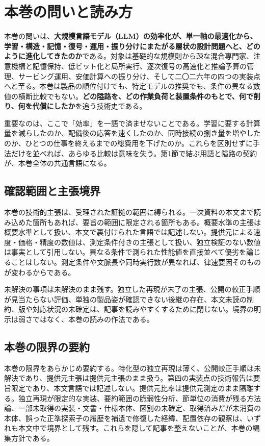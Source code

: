 \documentclass[lualatex,a4paper,10pt]{jlreq}
\begin{document}
\surveycover
\clearpage

\section*{本巻の問いと読み方}
本巻の問いは、\textbf{大規模言語モデル（LLM）の効率化が、単一軸の最適化から、学習・構造・記憶・復号・運用・振り分けにまたがる層状の設計問題へと、どのように進化してきたのか}である。対象は基礎的な規模則から疎な混合専門家、注意機構と記憶保持、低ビット化と局所実行、逐次復号の高速化と推論予算の管理、サービング運用、安価計算への振り分け、そして二〇二六年の四つの実装点へと至る。本巻は製品の順位付けでも、特定モデルの推奨でも、条件の異なる数値の横断比較でもない。\textbf{どの隘路を、どの作業負荷と装置条件のもとで、何で削り、何を代償にしたか}を追う技術史である。

重要なのは、ここで「効率」を一語で済ませないことである。学習に要する計算量を減らしたのか、配備後の応答を速くしたのか、同時接続の捌き量を増やしたのか、ひとつの仕事を終えるまでの総費用を下げたのか。これらを区別せずに手法だけを並べれば、あらゆる比較は意味を失う。第1節で結ぶ用語と隘路の契約が、本巻全体の共通言語になる。

\subsection*{確認範囲と主張境界}
本巻の技術的主張は、受理された証拠の範囲に縛られる。一次資料の本文まで読み込めた箇所もあれば、要旨の範囲に限定される箇所もある。概要水準の主張は概要水準として扱い、本文で裏付けられた言語では記述しない。提供元による速度・価格・精度の数値は、測定条件付きの主張として扱い、独立検証のない数値は事実として引用しない。異なる条件で測られた性能値を直接並べて優劣を論じることはしない。測定条件や文脈長や同時実行数が異なれば、律速要因そのものが変わるからである。

未解決の事項は未解決のまま残す。独立した再現が未了の主張、公開の較正手順が見当たらない評価、単独の製品姿が確認できない後継の存在、本文未読の制約、版や対応状況の未確定は、記事を読みやすくするために閉じない。境界の明示は弱さではなく、本巻の読みの作法である。

\subsection*{本巻の限界の要約}
本巻の限界をあらかじめ要約する。特化型の独立再現は薄く、公開較正手順は未解決であり、提供元主張は提供元主張のまま扱う。第四の実装点の技術報告は要旨限定であり、本文言語では記述しない。提供元比率は提供元測定のまま隔離する。独立再現が限定的な実装、要約範囲の脆弱性分析、節単位の消費が残る方法論、一部未取得の実装・文書・仕様本体、図別の未確定、取得済みだが未消費の本体、誤った正準探索子の履歴を補遺で修復した経緯、配置依存の観察は、いずれも本文中で境界として残す。これらを隠して記事を整えないことが、本巻の編集方針である。
\end{document}
